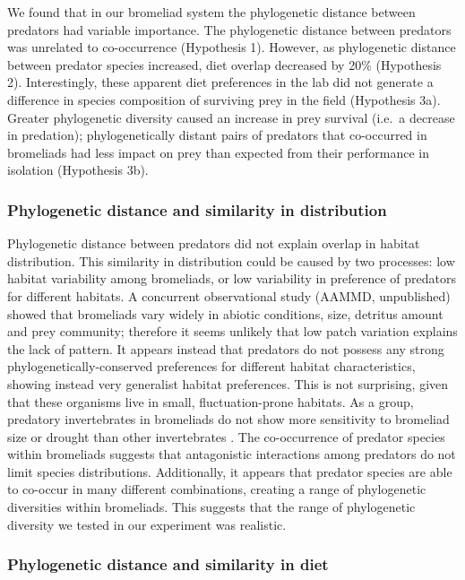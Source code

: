 We found that in our bromeliad system the phylogenetic distance between
predators had variable importance. The phylogenetic distance between
predators was unrelated to co-occurrence (Hypothesis 1). However, as
phylogenetic distance between predator species increased, diet overlap
decreased by 20\% (Hypothesis 2). Interestingly, these apparent diet
preferences in the lab did not generate a difference in species
composition of surviving prey in the field (Hypothesis 3a). Greater
phylogenetic diversity caused an increase in prey survival (i.e.~a
decrease in predation); phylogenetically distant pairs of predators that
co-occurred in bromeliads had less impact on prey than expected from
their performance in isolation (Hypothesis 3b).

\subsubsection{Phylogenetic distance and similarity in
distribution}\label{phylogenetic-distance-and-similarity-in-distribution}

Phylogenetic distance between predators did not explain overlap in
habitat distribution. This similarity in distribution could be caused by
two processes: low habitat variability among bromeliads, or low
variability in preference of predators for different habitats. A
concurrent observational study (AAMMD, unpublished) showed that
bromeliads vary widely in abiotic conditions, size, detritus amount and
prey community; therefore it seems unlikely that low patch variation
explains the lack of pattern. It appears instead that predators do not
possess any strong phylogenetically-conserved preferences for different
habitat characteristics, showing instead very generalist habitat
preferences. This is not surprising, given that these organisms live in
small, fluctuation-prone habitats. As a group, predatory invertebrates
in bromeliads do not show more sensitivity to bromeliad size or drought
than other invertebrates \citep{Amundrud2015}. The co-occurrence of
predator species within bromeliads suggests that antagonistic
interactions among predators do not limit species distributions.
Additionally, it appears that predator species are able to co-occur in
many different combinations, creating a range of phylogenetic
diversities within bromeliads. This suggests that the range of
phylogenetic diversity we tested in our experiment was realistic.

\subsubsection{Phylogenetic distance and similarity in
diet}\label{phylogenetic-distance-and-similarity-in-diet}

